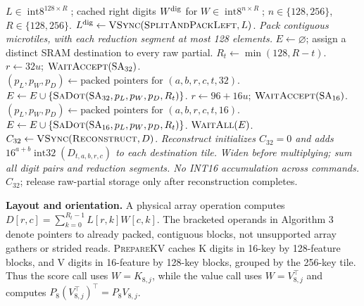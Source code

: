 \documentclass[11pt]{article}
\newcommand{\I}[1]{\operatorname{int#1}}
\newcommand{\VSync}{\textsc{VSync}}
\newcommand{\SafeDot}{\textsc{SafeDot}}
\begin{document}
\begin{algorithm}[H]
\caption{Control-CPU \SafeDot: $C=LW^{\top}$ using both systolic arrays}
\label{alg:dot}
\footnotesize
\begin{algorithmic}[1]
\Require $L\in\I{8}^{128\times R}$; cached right digits $W^{\rm dig}$ for
$W\in\I{8}^{n\times R}$; $n\in\{128,256\}$, $R\in\{128,256\}$.
\State $L^{\rm dig}\gets\VSync(\textsc{SplitAndPackLeft},L)$.
\Statex \hspace{\algorithmicindent}\textit{Pack contiguous microtiles, with each reduction segment at most 128 elements.}
\State $E\gets\varnothing$; assign a distinct SRAM destination to every raw partial.
    \State $R_t\gets\min(128,R-t)$.
                    \State $r\gets32u$; $\Call{WaitAccept}{\mathrm{SA}_{32}}$.
                    \State $(p_L,p_W,p_D)\gets\text{packed pointers for }(a,b,r,c,t,32)$.
                    \State $E\gets E\cup\{\Call{SaDot}{\mathrm{SA}_{32},p_L,p_W,p_D,R_t}\}$.
                        \State $r\gets96+16u$; $\Call{WaitAccept}{\mathrm{SA}_{16}}$.
                        \State $(p_L,p_W,p_D)\gets\text{packed pointers for }(a,b,r,c,t,16)$.
                        \State $E\gets E\cup\{\Call{SaDot}{\mathrm{SA}_{16},p_L,p_W,p_D,R_t}\}$.
                    \EndIf
                \EndFor
            \EndFor
        \EndFor
    \EndFor
\EndFor
\State $\Call{WaitAll}{E}$.
\State $C_{32}\gets\VSync(\textsc{Reconstruct},D)$.
\Statex \hspace{\algorithmicindent}\textit{Reconstruct initializes $C_{32}=0$ and adds $16^{a+b}\I{32}(D_{t,a,b,r,c})$ to each destination tile.}
\Statex \hspace{\algorithmicindent}\textit{Widen before multiplying; sum all digit pairs and reduction segments. No INT16 accumulation across commands.}
\State \Return $C_{32}$; release raw-partial storage only after reconstruction completes.
\end{algorithmic}
\end{algorithm}

\textbf{Layout and orientation.} A physical array operation computes
$D[r,c]=\sum_{k=0}^{R_t-1}L[r,k]W[c,k]$. The bracketed operands in Algorithm 3
denote pointers to already packed, contiguous blocks, not unsupported array
gathers or strided reads. \textsc{PrepareKV} caches K digits in 16-key by
128-feature blocks, and V digits in 16-feature by 128-key blocks, grouped by the
256-key tile. Thus the score call uses $W=K_{8,j}$, while the value call uses
$W=V_{8,j}^{\top}$ and computes $P_8(V_{8,j}^{\top})^{\top}=P_8V_{8,j}$.
\end{document}
